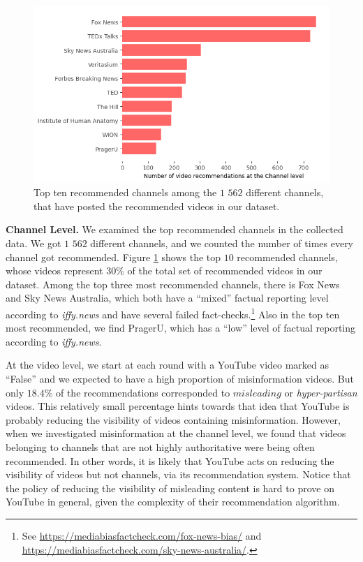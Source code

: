 \documentclass{article}
\begin{document}
\begin{figure}[h]
	\begin{center}
		\includegraphics[scale=0.45]{./img/channel_youtube.png} 
	\end{center}
	\caption{Top ten recommended channels among the $1$ $562$ different channels, that have posted the recommended videos in our dataset.}
	\label{channels_yt}
\end{figure}

{\bf Channel Level.} We examined the top recommended channels in the collected data. We got $1$ $562$ different channels, and we counted the number of times every channel got recommended. Figure \ref{channels_yt} shows the top $10$ recommended channels, whose videos represent $30\%$ of the total set of recommended videos in our dataset. Among the top three most recommended channels, there is Fox News and Sky News Australia, which both have a ``mixed'' factual reporting level according to {\it iffy.news} and have several failed fact-checks.\footnote{See \href{https://mediabiasfactcheck.com/fox-news-bias/}{https://mediabiasfactcheck.com/fox-news-bias/} and \href{https://mediabiasfactcheck.com/sky-news-australia/}{https://mediabiasfactcheck.com/sky-news-australia/}.} Also in the top ten most recommended, we find PragerU, which has a ``low'' level of factual reporting according to {\it iffy.news}. 

\smallskip 

At the video level, we start at each round with a YouTube video marked as ``False'' and we expected to have a high proportion of misinformation videos. But only {$18.4\%$} of the recommendations corresponded to $misleading$ or {\it hyper-partisan} videos.
This relatively small percentage hints towards that idea that YouTube is probably reducing the visibility of videos containing misinformation. However, when we investigated misinformation at the channel level, we found that videos belonging to channels that are not highly authoritative were being often recommended. In other words, it is likely that YouTube acts on reducing the visibility of videos but not channels, via its recommendation system. Notice that the policy of reducing the visibility of misleading content is hard to prove on YouTube in general, given the complexity of their recommendation algorithm.
\end{document}
